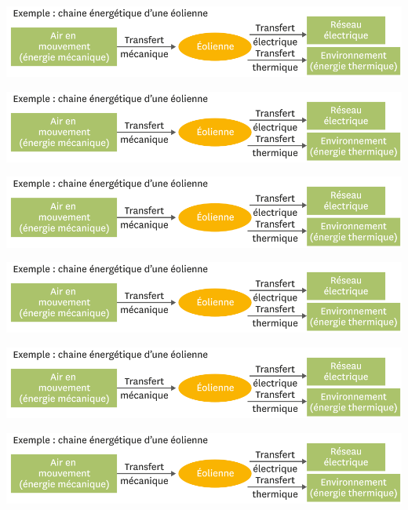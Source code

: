 \documentclass[12pt,a4paper]{article}
\begin{document}
\newpage

\begin{center}
	\includegraphics[scale=0.5]{chaine}
\end{center}

\begin{center}
	\includegraphics[scale=0.5]{chaine}
\end{center}

\begin{center}
	\includegraphics[scale=0.5]{chaine}
\end{center}

\begin{center}
	\includegraphics[scale=0.5]{chaine}
\end{center}

\begin{center}
	\includegraphics[scale=0.5]{chaine}
\end{center}

\begin{center}
	\includegraphics[scale=0.5]{chaine}
\end{center}
\end{document}
